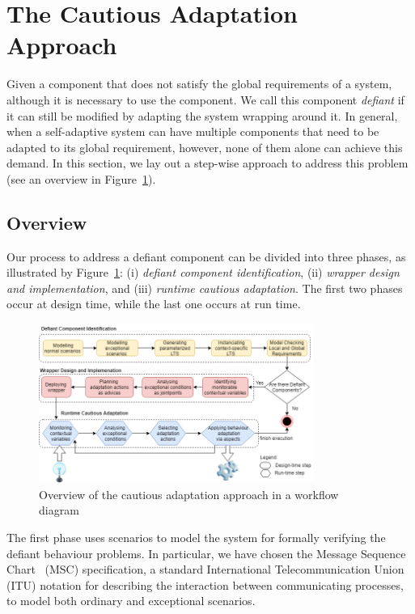 \section{The Cautious Adaptation Approach}

Given a component that does not satisfy the global requirements of a system, although it is necessary to use the component. We call this component {\em defiant} if it can still be modified by adapting the system wrapping around it. In general, when a self-adaptive system can have multiple components that need to be adapted to its global requirement, however, none of them alone can achieve this demand. In this section, we lay out a step-wise approach to address this problem (see an overview in Figure~\ref{fig:process}).

\subsection{Overview}

Our process to address a defiant component can be divided into three phases, as illustrated by Figure~\ref{fig:process}: (i) \textit{defiant component identification}, (ii) \textit{wrapper design and implementation}, and (iii) \textit{runtime cautious adaptation}. The first two phases occur at design time, while the last one occurs at run time. %

\begin{figure}[h]\centering
 \includegraphics[width=0.8\textwidth]{figures/workflow2.png}
 \caption{Overview of the cautious adaptation approach in a workflow diagram}
 \label{fig:process}
 \vspace*{-0.5cm}
\end{figure}

The first phase uses scenarios to model the system for formally verifying the defiant behaviour problems. In particular, we have chosen the Message Sequence Chart~\cite{harel2003} (MSC) specification, a standard International Telecommunication Union (ITU) notation for describing the interaction between communicating processes, to model both ordinary and exceptional scenarios. 

